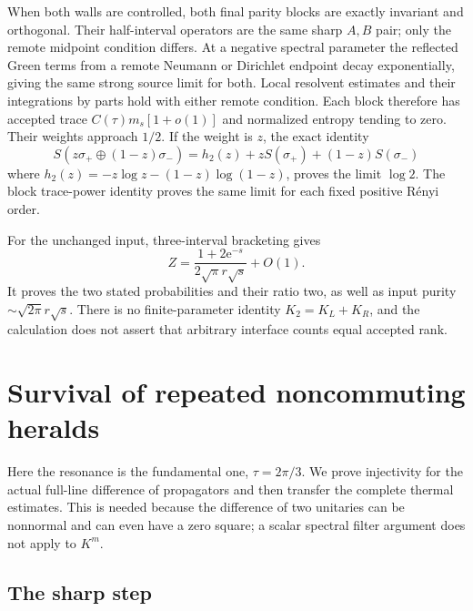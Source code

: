 \documentclass[aps,pra,reprint,superscriptaddress,longbibliography]{revtex4-2}
\newcommand{\ee}{\mathrm e}
\begin{document}
When both walls are controlled, both final parity blocks are
exactly invariant and orthogonal. Their half-interval operators
are the same sharp $A,B$ pair; only the remote midpoint condition
differs. At a negative spectral parameter the reflected Green
terms from a remote Neumann or Dirichlet endpoint decay
exponentially, giving the same strong source limit for both.
Local resolvent estimates and their integrations by parts hold
with either remote condition. Each block therefore has accepted
trace $C(\tau)m_s[1+o(1)]$ and normalized entropy tending to zero.
Their weights approach $1/2$. If the weight is $z$, the exact
identity
\begin{equation}
 S(z\sigma_+\oplus(1-z)\sigma_-)
 =h_2(z)+zS(\sigma_+)+(1-z)S(\sigma_-)                   \label{eq:switchentropy}
\end{equation}
where $h_2(z)=-z\log z-(1-z)\log(1-z)$, proves the limit
$\log2$. The block trace-power identity proves
the same limit for each fixed positive R\'enyi order.

For the unchanged input, three-interval bracketing gives
\begin{equation}
 Z=\frac{1+2\ee^{-s}}{2\sqrt\pi r\sqrt s}+O(1).        \label{eq:switchpartition}
\end{equation}
It proves the two stated probabilities and their ratio two,
as well as input purity $\sim\sqrt{2\pi}r\sqrt s$.
There is no finite-parameter identity $K_2=K_L+K_R$, and the
calculation does not assert that arbitrary interface counts
equal accepted rank.

\section{Survival of repeated noncommuting heralds}
\label{app:repeat}

Here the resonance is the fundamental one, $\tau=2\pi/3$.
We prove injectivity for the actual full-line difference of
propagators and then transfer the complete thermal estimates.
This is needed because the difference of two unitaries can be
nonnormal and can even have a zero square; a scalar spectral
filter argument does not apply to $K^m$.

\subsection{The sharp step}
\end{document}
